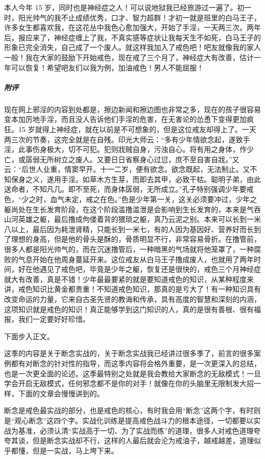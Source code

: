 \begin{case}
    本人今年 15 岁，同时也是神经症之人！可以说地狱我已经旅游过一遍了。初一时，阳光帅气的我不止成绩优秀，口才、智力超群！才初一就是班里的白马王子，许多女生都喜欢我，在这花丛中我色心愈加强大，开始了手淫，一天两三次。两年后，报应来了，神经症缠上了我，不真实感等症状让我每天生不如死，白马王子的形象已完全消失，自己成了一个废人。就这样我加入了戒色吧！吧友就像我的家人一般！我在大家的鼓励下开始戒色，现在戒了三个月了，神经症大有改善，估计一年可以恢复！希望吧友们以我为例，加油戒色！男人不能屈服！
    \subparagraph{附评} 现在网上邪淫的内容到处都是，擦边新闻和擦边图也非常之多，现在的孩子很容易变本加厉地手淫，而且没人告诉他们手淫的危害，在无害论的怂恿下变得更加疯狂。15 岁就得上神经症，就在以前是不可想象的，但是这位戒友却得上了。一天两三次的节奏，这完全就是在自残。印光大师云：“多有少年情欲念起，遂致手淫，此事伤身极大，切不可犯。犯则戕贼自身，污浊自心。将有用之身体，作少亡，或孱弱无所树立之废人。又要日日省察身心过愆，庶不至自害自戕。”又云：“后世人业重，情窦早开。十一二岁，便有欲念。欲念既起，无法制止。又不知保身之义，遂用手淫。如草木方生芽，而即去其甲，必致干枯。聪明子弟，由此送命者，不知凡几。即不至死，而身体孱弱，无所成立。”孔子特别强调少年要戒色，“少之时，血气未定，戒之在色。”色是少年第一关，这关必须要冲过，少年之躯尚处在生长发育阶段，在这个阶段滥撸滥泄是会影响到生长发育的，本来是气吞山河英雄之躯，最后撸成佝偻着背的猥琐之躯，真乃云泥之别。本来可以长到一米八以上，最后因为耗泄肾精，只能长到一米七，有的人因为基因好、营养好而长到了理想的身高，但是他的骨头是酥的，骨质明显不行，非常容易骨折。在撸管前，很多人都是阳光帅气的，而在沉迷撸管后，一种暗黑的气场就将他笼罩了，一种腐败的气息开始在他周身蔓延开来。这位戒友从白马王子撸成废人，也就用了两年时间，好在他遇见了戒色吧，毕竟是少年之躯，恢复还是很快的，戒色三个月神经症就大有改善，真是不错！少年最最要紧的就是要知道戒色的知识，从某种程度来讲，戒色知识比黄金都贵重！不知道戒色知识，那真的是亏大了！有一种知识具有改变命运的力量，它来自古圣先贤的教诲和传承，具有高度的智慧和深刻的内涵，这项知识就是戒色的知识！真正能够学到这门知识的人，真的是很有善根、很有福报，我们一定要好好珍惜。
\end{case}

下面步入正文。

这季的内容是关于断念实战的，关于断念实战我已经讲过很多季了，前言的很多案例都有对断念的针对性的指导，而这季内容将会格外重要，是一次更深入的总结，也是一次更全面的论述。这季最特别之处就是我会教给大家断念的无敌模式！一旦学会开启无敌模式，任何邪念都不是你的对手！就像在你的头脑里无限制发大招一样，下面的文章会慢慢讲到的。

断念是戒色最实战的部分，也是戒色的核心，有时我会用“断念”这两个字，有时则是“观心断念”这四个字。实战化训练是提高戒色战斗力的根本途径，一切都要以实战为基准，必须认清“实战高于一切、为了实战而练”的道理，很多人对戒色道理夸夸其谈，但是断念实战却不行，这样的人最后就会沦为戒油子，越戒越差，道理似乎都懂，但是一实战，马上垮下来。

